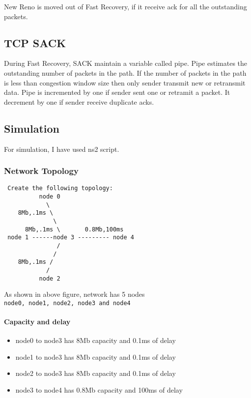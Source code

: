 \documentclass[11pt]{article}
\providecommand{\tightlist}{%
      \setlength{\itemsep}{0pt}\setlength{\parskip}{0pt}}
\begin{document}
New Reno is moved out of Fast Recovery, if it receive ack for all the
outstanding packets.

    \subsection{TCP SACK}\label{tcp-sack}

During Fast Recovery, SACK maintain a variable called pipe. Pipe
estimates the outstanding number of packets in the path. If the number
of packets in the path is less than congestion window size then only
sender transmit new or retransmit data. Pipe is incremented by one if
sender sent one or retramit a packet. It decrement by one if sender
receive duplicate acks.

    \subsection{Simulation}\label{simulation}

For simulation, I have used ns2 script.

    \subsubsection{Network Topology}\label{network-topology}

\begin{verbatim}
 Create the following topology:             
          node 0
            \ 
    8Mb,.1ms \ 
              \ 
      8Mb,.1ms \       0.8Mb,100ms
 node 1 ------node 3 --------- node 4
               /
              /
    8Mb,.1ms /
            /
          node 2
\end{verbatim}

As shown in above figure, network has 5 nodes
\texttt{node0,\ node1,\ node2,\ node3\ and\ node4}

\paragraph{Capacity and delay}\label{capacity-and-delay}

\begin{itemize}
\tightlist
\item
  node0 to node3 has 8Mb capacity and 0.1ms of delay
\item
  node1 to node3 has 8Mb capacity and 0.1ms of delay
\item
  node2 to node3 has 8Mb capacity and 0.1ms of delay
\item
  node3 to node4 has 0.8Mb capacity and 100ms of delay
\end{itemize}
\end{document}
